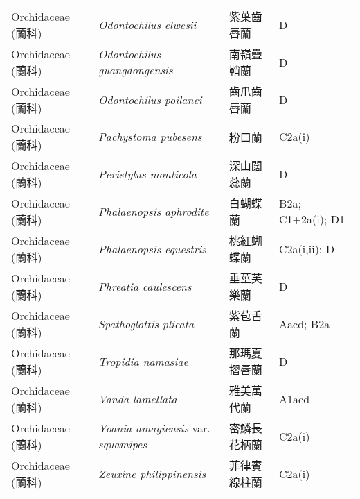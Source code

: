 \begin{longtable}{p{3cm}p{5cm}p{3cm}p{4cm}}
    Orchidaceae (蘭科) & \textit{Odontochilus elwesii}  & 紫葉齒唇蘭 & D \index{Odontochilus@\textit{Odontochilus}!elwesii@\textit{elwesii}}  \index{紫葉齒唇蘭} \\
    Orchidaceae (蘭科) & \textit{Odontochilus guangdongensis}  & 南嶺疊鞘蘭 & D \index{Odontochilus@\textit{Odontochilus}!guangdongensis@\textit{guangdongensis}}  \index{南嶺疊鞘蘭} \\
    Orchidaceae (蘭科) & \textit{Odontochilus poilanei}  & 齒爪齒唇蘭 & D \index{Odontochilus@\textit{Odontochilus}!poilanei@\textit{poilanei}}  \index{齒爪齒唇蘭} \\
    Orchidaceae (蘭科) & \textit{Pachystoma pubesens}  & 粉口蘭 & C2a(i) \index{Pachystoma@\textit{Pachystoma}!pubesens@\textit{pubesens}}  \index{粉口蘭} \\
    Orchidaceae (蘭科) & \textit{Peristylus monticola}  & 深山闊蕊蘭 & D \index{Peristylus@\textit{Peristylus}!monticola@\textit{monticola}}  \index{深山闊蕊蘭} \\
    Orchidaceae (蘭科) & \textit{Phalaenopsis aphrodite}  & 白蝴蝶蘭 & B2a; C1+2a(i); D1 \index{Phalaenopsis@\textit{Phalaenopsis}!aphrodite@\textit{aphrodite}}  \index{白蝴蝶蘭} \\
    Orchidaceae (蘭科) & \textit{Phalaenopsis equestris}  & 桃紅蝴蝶蘭 & C2a(i,ii); D \index{Phalaenopsis@\textit{Phalaenopsis}!equestris@\textit{equestris}}  \index{桃紅蝴蝶蘭} \\
    Orchidaceae (蘭科) & \textit{Phreatia caulescens}  & 垂莖芙樂蘭 & D \index{Phreatia@\textit{Phreatia}!caulescens@\textit{caulescens}}  \index{垂莖芙樂蘭} \\
    Orchidaceae (蘭科) & \textit{Spathoglottis plicata}  & 紫苞舌蘭 & Aacd; B2a \index{Spathoglottis@\textit{Spathoglottis}!plicata@\textit{plicata}}  \index{紫苞舌蘭} \\
    Orchidaceae (蘭科) & \textit{Tropidia namasiae}  & 那瑪夏摺唇蘭 & D \index{Tropidia@\textit{Tropidia}!namasiae@\textit{namasiae}}  \index{那瑪夏摺唇蘭} \\
    Orchidaceae (蘭科) & \textit{Vanda lamellata}  & 雅美萬代蘭 & A1acd \index{Vanda@\textit{Vanda}!lamellata@\textit{lamellata}}  \index{雅美萬代蘭} \\
    Orchidaceae (蘭科) & \textit{Yoania amagiensis} var. \textit{squamipes}  & 密鱗長花柄蘭 & C2a(i) \index{Yoania@\textit{Yoania}!amagiensis@\textit{amagiensis}!var. squamipes@var. \textit{squamipes}}  \index{密鱗長花柄蘭} \\
    Orchidaceae (蘭科) & \textit{Zeuxine philippinensis}  & 菲律賓線柱蘭 & C2a(i) \index{Zeuxine@\textit{Zeuxine}!philippinensis@\textit{philippinensis}}  \index{菲律賓線柱蘭} \\

\end{longtable}
